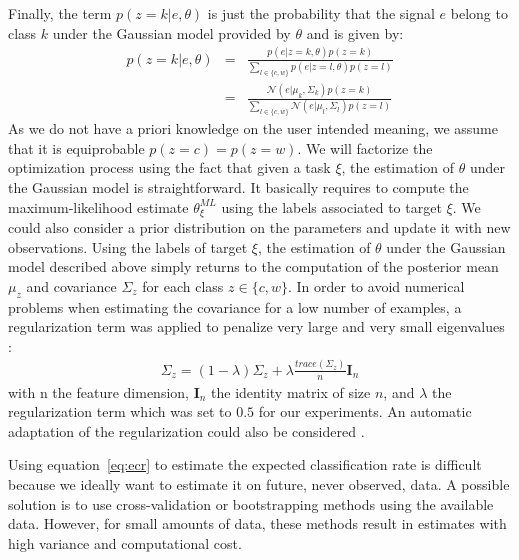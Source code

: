 \documentclass[letterpaper]{article}
\begin{document}
Finally, the term $p(z=k|e,\theta)$ is just the probability that the signal $e$ belong to class $k$ under the Gaussian model provided by $\theta$ and is given by:
%
\begin{eqnarray}
    p(z=k|e,\theta) &=& 
                \frac{p(e|z=k, \theta)p(z = k)}{\sum_{l \in \{c,w\}}{p(e|z=l,\theta)p(z=l)}}\nonumber\\
                 &=& \frac{\mathcal{N}(e|\mu_k, \Sigma_k)p(z = k)}{\sum_{l \in \{c,w\}}{\mathcal{N}(e|\mu_l, \Sigma_l)p(z=l)}}
    \label{eq:dev}
\end{eqnarray}
%
As we do not have a priori knowledge on the user intended meaning, we assume that it is equiprobable $p(z = c) = p(z = w)$. We will factorize the optimization process using the fact that given a task $\xi$, the estimation of $\theta$ under the Gaussian model is straightforward. It basically requires to compute the maximum-likelihood estimate $\theta^{ML}_{\xi}$ using the labels associated to target $\xi$. We could also consider a prior distribution on the parameters and update it with new observations. Using the labels of target $\xi$, the estimation of $\theta$ under the Gaussian model described above simply returns to the computation of the posterior mean $\mu_z$ and covariance $\Sigma_z$ for each class $z \in \{c, w\}$. In order to avoid numerical problems when estimating the covariance for a low number of examples, a regularization term was applied to penalize very large and very small eigenvalues \cite{friedman1989regularized}:
%
\begin{eqnarray}
\Sigma_z = (1-\lambda)\Sigma_z + \lambda \frac{trace(\Sigma_z)}{n} \textbf{I}_n
\end{eqnarray}
%
with n the feature dimension, $\textbf{I}_n$ the identity matrix of size $n$, and $\lambda$ the regularization term which was set to $0.5$ for our experiments. An automatic adaptation of the regularization could also be considered \cite{ledoit2004well}.

Using equation~\ref{eq:ecr} to estimate the expected classification rate is difficult because we ideally want to estimate it on future, never observed, data. A possible solution is to use cross-validation or bootstrapping methods using the available data. However, for small amounts of data, these methods result in estimates with high variance \cite{bengio2004no} and computational cost.
\end{document}
